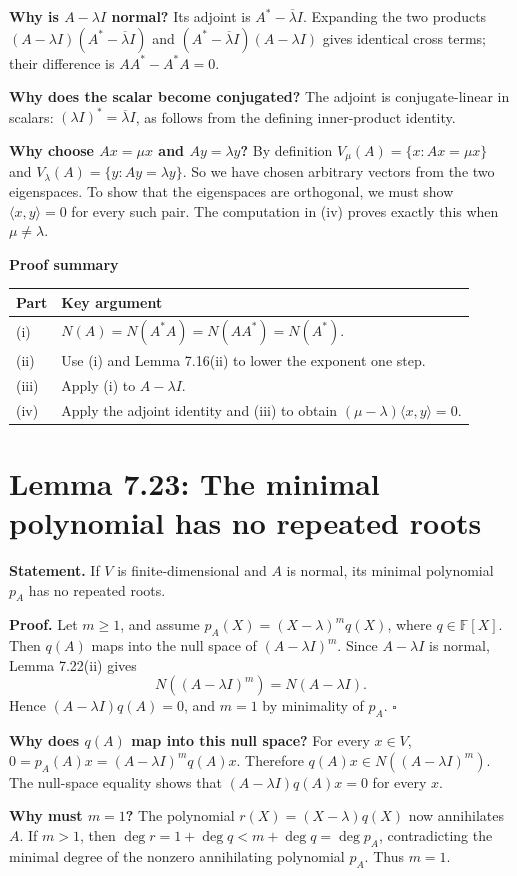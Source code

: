 \documentclass[11pt,a4paper]{article}
\newcommand{\prooftable}[1]{\medskip\textbf{Proof summary}\par\smallskip #1\medskip}
\begin{document}
\begin{personalnote}
\textbf{Why is \(A-\lambda I\) normal?}
Its adjoint is \(A^*-\overline\lambda I\). Expanding the two products
\((A-\lambda I)(A^*-\overline\lambda I)\) and
\((A^*-\overline\lambda I)(A-\lambda I)\) gives identical cross terms; their difference is \(AA^*-A^*A=0\).

\medskip

\textbf{Why does the scalar become conjugated?}
The adjoint is conjugate-linear in scalars: \((\lambda I)^*=\overline\lambda I\), as follows from the defining inner-product identity.

\medskip
\textbf{Why choose \(Ax=\mu x\) and \(Ay=\lambda y\)?}
By definition \(V_\mu(A)=\{x:Ax=\mu x\}\) and \(V_\lambda(A)=\{y:Ay=\lambda y\}\). So we have chosen arbitrary vectors from the two eigenspaces. To show that the eigenspaces are orthogonal, we must show \(\langle x,y\rangle=0\) for every such pair. The computation in (iv) proves exactly this when \(\mu\neq\lambda\).
\end{personalnote}
\prooftable{\begin{tabularx}{\linewidth}{@{}p{.22\linewidth}X@{}}\hline
Part & Key argument\\\hline
(i) & \(N(A)=N(A^*A)=N(AA^*)=N(A^*)\).\\
(ii) & Use (i) and Lemma 7.16(ii) to lower the exponent one step.\\
(iii) & Apply (i) to \(A-\lambda I\).\\
(iv) & Apply the adjoint identity and (iii) to obtain \((\mu-\lambda)\langle x,y\rangle=0\).\\\hline
\end{tabularx}}

\section{Lemma 7.23: The minimal polynomial has no repeated roots}
\textbf{Statement.} If \(V\) is finite-dimensional and \(A\) is normal, its minimal polynomial \(p_A\) has no repeated roots.

\textbf{Proof.} Let \(m\geq1\), and assume \(p_A(X)=(X-\lambda)^m q(X)\), where \(q\in\mathbb F[X]\). Then \(q(A)\) maps into the null space of \((A-\lambda I)^m\). Since \(A-\lambda I\) is normal, Lemma 7.22(ii) gives
\[
N((A-\lambda I)^m)=N(A-\lambda I).
\]
Hence \((A-\lambda I)q(A)=0\), and \(m=1\) by minimality of \(p_A\). \(\square\)

\begin{personalnote}
\textbf{Why does \(q(A)\) map into this null space?}
For every \(x\in V\), \(0=p_A(A)x=(A-\lambda I)^m q(A)x\). Therefore \(q(A)x\in N((A-\lambda I)^m)\). The null-space equality shows that \((A-\lambda I)q(A)x=0\) for every \(x\).

\medskip
\textbf{Why must \(m=1\)?}
The polynomial \(r(X)=(X-\lambda)q(X)\) now annihilates \(A\). If \(m>1\), then \(\deg r=1+\deg q<m+\deg q=\deg p_A\), contradicting the minimal degree of the nonzero annihilating polynomial \(p_A\). Thus \(m=1\).
\end{personalnote}
\end{document}

